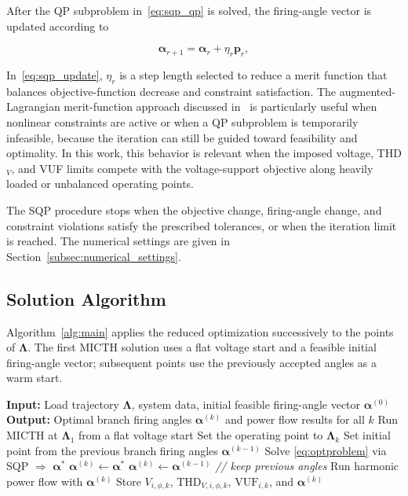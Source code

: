 \documentclass[journal]{IEEEtran}
\begin{document}
After the QP subproblem in~\eqref{eq:sqp_qp} is solved, the firing-angle vector
is updated according to

\begin{equation}
    \boldsymbol{\alpha}_{r+1}
    = \boldsymbol{\alpha}_r + \eta_r \mathbf{p}_r,
    \label{eq:sqp_update}
\end{equation}

In~\eqref{eq:sqp_update}, $\eta_r$ is a step length selected to reduce a merit function
that balances objective-function decrease and constraint satisfaction. The
augmented-Lagrangian merit-function approach discussed in~\cite{Gill2005SNOPT}
is particularly useful when nonlinear constraints are active or when a QP
subproblem is temporarily infeasible, because the iteration can still be guided
toward feasibility and optimality. In this work, this behavior is relevant when
the imposed voltage, THD$_V$, and VUF limits compete with the voltage-support
objective along heavily loaded or unbalanced operating points.

The SQP procedure stops when the objective change, firing-angle change, and
constraint violations satisfy the prescribed tolerances, or when the iteration
limit is reached. The numerical settings are given in
Section~\ref{subsec:numerical_settings}.

\subsection{Solution Algorithm}
\label{subsec:algorithm}

Algorithm~\ref{alg:main} applies the reduced optimization successively to the
points of $\boldsymbol{\Lambda}$. The first MICTH solution uses a flat voltage
start and a feasible initial firing-angle vector; subsequent points use the
previously accepted angles as a warm start.

\begin{algorithm}[H]
\caption{Optimal SVC Control Along the Load Curve}
\label{alg:main}
\begin{algorithmic}[1]
\State \textbf{Input:} Load trajectory $\boldsymbol{\Lambda}$, system data, initial feasible firing-angle vector $\boldsymbol{\alpha}^{(0)}$
\State \textbf{Output:} Optimal branch firing angles $\boldsymbol{\alpha}^{(k)}$ and power flow results for all $k$
\State Run MICTH at $\boldsymbol{\Lambda}_1$ from a flat voltage start
    \State Set the operating point to $\boldsymbol{\Lambda}_k$
    \State Set initial point from the previous branch firing angles $\boldsymbol{\alpha}^{(k-1)}$
    \State Solve \eqref{eq:optproblem} via SQP $\Rightarrow$ $\boldsymbol{\alpha}^*$
        \State $\boldsymbol{\alpha}^{(k)} \leftarrow \boldsymbol{\alpha}^*$
    \Else
        \State $\boldsymbol{\alpha}^{(k)} \leftarrow \boldsymbol{\alpha}^{(k-1)}$ \quad \textit{// keep previous angles}
    \EndIf
    \State Run harmonic power flow with $\boldsymbol{\alpha}^{(k)}$
    \State Store $V_{i,\phi,k}$, $\mathrm{THD}_{V,i,\phi,k}$, $\mathrm{VUF}_{i,k}$, and $\boldsymbol{\alpha}^{(k)}$
\EndFor
\end{algorithmic}
\end{algorithm}
\end{document}
